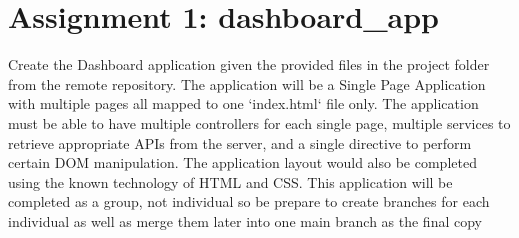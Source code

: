 \documentclass[12pt]{article}
\begin{document}
\section{Assignment 1: dashboard\_app}
Create the Dashboard application given the provided files in the project folder from the remote repository. The application will be a Single Page Application with multiple pages all mapped to one `index.html` file only. The application must be able to have multiple controllers for each single page, multiple services to retrieve appropriate APIs from the server, and a single directive to perform certain DOM manipulation. The application layout would also be completed using the known technology of HTML and CSS. This application will be completed as a group, not individual so be prepare to create branches for each individual as well as merge them later into one main branch as the final copy
\end{document}
